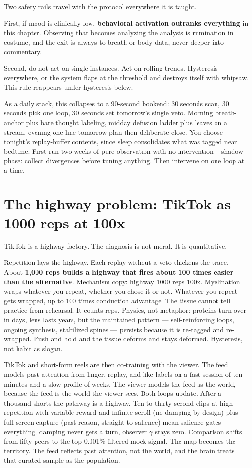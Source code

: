 Two safety rails travel with the protocol everywhere it is taught.

First, if mood is clinically low, \textbf{behavioral activation outranks everything} in this chapter. Observing that becomes analyzing the analysis is rumination in costume, and the exit is always to breath or body data, never deeper into commentary.

Second, do not act on single instances. Act on rolling trends. Hysteresis everywhere, or the system flaps at the threshold and destroys itself with whipsaw. This rule reappears under hysteresis below.

As a daily stack, this collapses to a 90-second bookend: 30 seconds scan, 30 seconds pick one loop, 30 seconds set tomorrow's single veto. Morning breath-anchor plus bare thought labeling, midday defusion ladder plus leaves on a stream, evening one-line tomorrow-plan then deliberate close. You choose tonight's replay-buffer contents, since sleep consolidates what was tagged near bedtime. First run two weeks of pure observation with no intervention -- shadow phase: collect divergences before tuning anything. Then intervene on one loop at a time.

\section{The highway problem: TikTok as 1000 reps at 100x}

TikTok is a highway factory. The diagnosis is not moral. It is quantitative.

Repetition lays the highway. Each replay without a veto thickens the trace. About \textbf{1,000 reps builds a highway that fires about 100 times easier than the alternative}. Mechanism copy: highway 1000 reps 100x. Myelination wraps whatever you repeat, whether you chose it or not. Whatever you repeat gets wrapped, up to 100 times conduction advantage. The tissue cannot tell practice from rehearsal. It counts reps. Physics, not metaphor: proteins turn over in days, lens lasts years, but the maintained pattern --- self-reinforcing loops, ongoing synthesis, stabilized spines --- persists because it is re-tagged and re-wrapped. Push and hold and the tissue deforms and stays deformed. Hysteresis, not habit as slogan.

TikTok and short-form reels are then co-training with the viewer. The feed models past attention from linger, replay, and like labels on a fast session of ten minutes and a slow profile of weeks. The viewer models the feed as the world, because the feed is the world the viewer sees. Both loops update. After a thousand shorts the pathway is a highway. Ten to thirty second clips at high repetition with variable reward and infinite scroll (no damping by design) plus full-screen capture (past reason, straight to salience) mean salience gates everything, damping never gets a turn, observer $\gamma$ stays zero. Comparison shifts from fifty peers to the top 0.001\% filtered mock signal. The map becomes the territory. The feed reflects past attention, not the world, and the brain treats that curated sample as the population.

